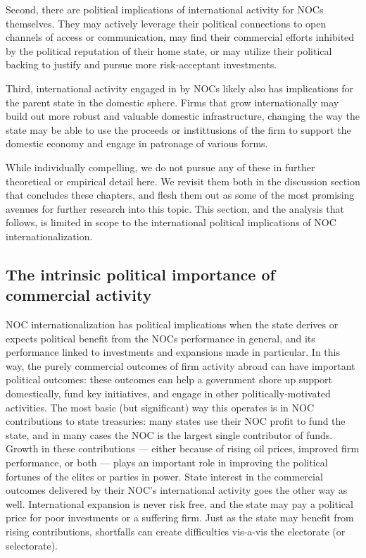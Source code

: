 \documentclass[11pt,]{book}
\begin{document}
Second, there are political implications of international activity for NOCs themselves. They may actively leverage their political connections to open channels of access or communication, may find their commercial efforts inhibited by the political reputation of their home state, or may utilize their political backing to justify and pursue more risk-acceptant investments.

Third, international activity engaged in by NOCs likely also has implications for the parent state in the domestic sphere. Firms that grow internationally may build out more robust and valuable domestic infrastructure, changing the way the state may be able to use the proceeds or instittusions of the firm to support the domestic economy and engage in patronage of various forms.

While individually compelling, we do not pursue any of these in further theoretical or empirical detail here. We revisit them both in the discussion section that concludes these chapters, and flesh them out as some of the most promising avenues for further research into this topic. This section, and the analysis that follows, is limited in scope to the international political implications of NOC internationalization.

\hypertarget{the-intrinsic-political-importance-of-commercial-activity}{%
\subsection{The intrinsic political importance of commercial activity}\label{the-intrinsic-political-importance-of-commercial-activity}}

NOC internationalization has political implications when the state derives or expects political benefit from the NOCs performance in general, and its performance linked to investments and expansions made in particular. In this way, the purely commercial outcomes of firm activity abroad can have important political outcomes: these outcomes can help a government shore up support domestically, fund key initiatives, and engage in other politically-motivated activities. The most basic (but significant) way this operates is in NOC contributions to state treasuries: many states use their NOC profit to fund the state, and in many cases the NOC is the largest single contributor of funds. Growth in these contributions --- either because of rising oil prices, improved firm performance, or both --- plays an important role in improving the political fortunes of the elites or parties in power. State interest in the commercial outcomes delivered by their NOC's international activity goes the other way as well. International expansion is never risk free, and the state may pay a political price for poor investments or a suffering firm. Just as the state may benefit from rising contributions, shortfalls can create difficulties vis-a-vis the electorate (or selectorate).
\end{document}
